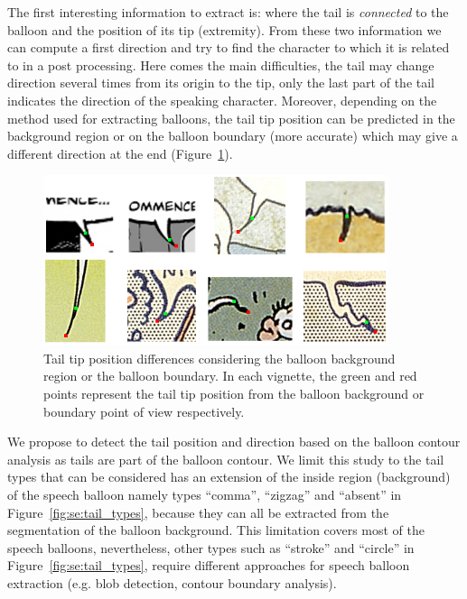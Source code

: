 The first interesting information to extract is: where the tail is \emph{connected} to the balloon and the position of its tip (extremity).
From these two information we can compute a first direction and try to find the character to which it is related to in a post processing.
Here comes the main difficulties, the tail may change direction several times from its origin to the tip, only the last part of the tail indicates the direction of the speaking character.
Moreover, depending on the method used for extracting balloons, the tail tip position can be predicted in the background region or on the balloon boundary (more accurate) which may give a different direction at the end (Figure~\ref{fig:se:tail_examples}).


    \begin{figure}[ht]%
      \centering
      \includegraphics[width=0.9\textwidth]{tail_examples.png}
    \caption[Differences between tail tip positions]{Tail tip position differences considering the balloon background region or the balloon boundary. In each vignette, the green and red points represent the tail tip position from the balloon background or boundary point of view respectively.}
    \label{fig:se:tail_examples}
    \end{figure}

We propose to detect the tail position and direction based on the balloon contour analysis as tails are part of the balloon contour.
We limit this study to the tail types that can be considered has an extension of the inside region (background) of the speech balloon namely types ``comma'', ``zigzag'' and ``absent'' in Figure~\ref{fig:se:tail_types}, because they can all be extracted from the segmentation of the balloon background.
This limitation covers most of the speech balloons, nevertheless, other types such as ``stroke'' and ``circle'' in Figure~\ref{fig:se:tail_types}, require different approaches for speech balloon extraction (e.g. blob detection, contour boundary analysis).


